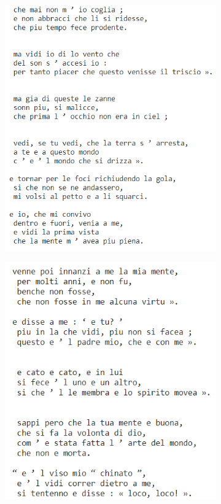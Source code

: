 \documentclass[10pt,twocolumn,letterpaper]{article}
\begin{document}
\begin{figure}[ht]
\centering
\begin{subfigure}{.5\linewidth}
  \centering
  \includegraphics[width=\linewidth]{dante1.png}
  \label{fig:dante1}
\end{subfigure}%
\begin{subfigure}{.5\linewidth}
  \centering
  \includegraphics[width=\linewidth]{dante2.png}

\end{subfigure}
\end{figure}
\end{document}
